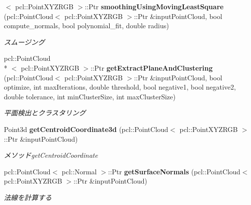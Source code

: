 \begin{DoxyCompactItemize}
$<$ pcl\-::\-Point\-X\-Y\-Z\-R\-G\-B $>$\-::Ptr {\bf smoothing\-Using\-Moving\-Least\-Square} (pcl\-::\-Point\-Cloud$<$ pcl\-::\-Point\-X\-Y\-Z\-R\-G\-B $>$\-::Ptr \&input\-Point\-Cloud, bool compute\-\_\-normals, bool polynomial\-\_\-fit, double radius)
\begin{DoxyCompactList}\small\item\em スムージング \end{DoxyCompactList}\item 
pcl\-::\-Point\-Cloud\\*
$<$ pcl\-::\-Point\-X\-Y\-Z\-R\-G\-B $>$\-::Ptr {\bf get\-Extract\-Plane\-And\-Clustering} (pcl\-::\-Point\-Cloud$<$ pcl\-::\-Point\-X\-Y\-Z\-R\-G\-B $>$\-::Ptr \&input\-Point\-Cloud, bool optimize, int max\-Iterations, double threshold, bool negative1, bool negative2, double tolerance, int min\-Cluster\-Size, int max\-Cluster\-Size)
\begin{DoxyCompactList}\small\item\em 平面検出とクラスタリング \end{DoxyCompactList}\item 
Point3d {\bf get\-Centroid\-Coordinate3d} (pcl\-::\-Point\-Cloud$<$ pcl\-::\-Point\-X\-Y\-Z\-R\-G\-B $>$\-::Ptr \&input\-Point\-Cloud)
\begin{DoxyCompactList}\small\item\em メソッドget\-Centroid\-Coordinate \end{DoxyCompactList}\item 
pcl\-::\-Point\-Cloud$<$ pcl\-::\-Normal $>$\-::Ptr {\bf get\-Surface\-Normals} (pcl\-::\-Point\-Cloud$<$ pcl\-::\-Point\-X\-Y\-Z\-R\-G\-B $>$\-::Ptr \&input\-Point\-Cloud)
\begin{DoxyCompactList}\small\item\em 法線を計算する \end{DoxyCompactList}\end{DoxyCompactItemize}
